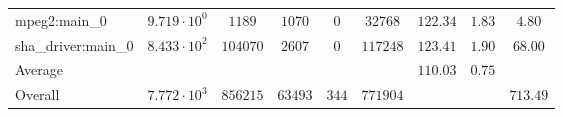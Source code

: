 \begin{tabular}{|l|c|c|c|c|c|c|c|c|}
mpeg2:main\_0           & $ 9.719 \cdot 10^{0} $ & $ 1189   $ & $ 1070  $ & $ 0   $ & $ 32768  $ & $ 122.34      $ & $ 1.83    $ & $ 4.80    $ \\
sha\_driver:main\_0     & $ 8.433 \cdot 10^{2} $ & $ 104070 $ & $ 2607  $ & $ 0   $ & $ 117248 $ & $ 123.41      $ & $ 1.90    $ & $ 68.00   $ \\
\hline
Average                 & $                    $ & $        $ & $       $ & $     $ & $        $ & $ 110.03      $ & $ 0.75    $ & $         $ \\
\hline
Overall                 & $ 7.772 \cdot 10^{3} $ & $ 856215 $ & $ 63493 $ & $ 344 $ & $ 771904 $ & $             $ & $         $ & $ 713.49  $ \\
\hline
\end{tabular}
